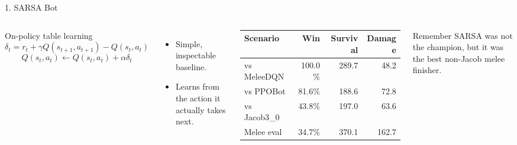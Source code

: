 \documentclass[12pt,aspectratio=169]{beamer}
\begin{document}
\begin{frame}{1. SARSA Bot}
\small
\begin{columns}[T,totalwidth=\textwidth]
\begin{block}{On-policy table learning}
\small
\[
\delta_t=r_t+\gamma Q(s_{t+1},a_{t+1})-Q(s_t,a_t)
\]
\[
Q(s_t,a_t)\leftarrow Q(s_t,a_t)+\alpha\delta_t
\]
\end{block}
\begin{itemize}
  \item Simple, inspectable baseline.
  \item Learns from the action it actually takes next.
\end{itemize}

\small
\begin{table}
\centering
\begin{tabular}{lrrr}
\toprule
\textbf{Scenario} & \textbf{Win} & \textbf{Survival} & \textbf{Damage} \\
\midrule
vs MeleeDQN & 100.0\% & 289.7 & 48.2 \\
vs PPOBot & 81.6\% & 188.6 & 72.8 \\
vs Jacob3\_0 & 43.8\% & 197.0 & 63.6 \\
Melee eval & 34.7\% & 370.1 & 162.7 \\
\bottomrule
\end{tabular}
\end{table}
\begin{block}{Remember}
SARSA was not the champion, but it was the best non-Jacob melee finisher.
\end{block}
\end{columns}
\end{frame}
\end{document}
